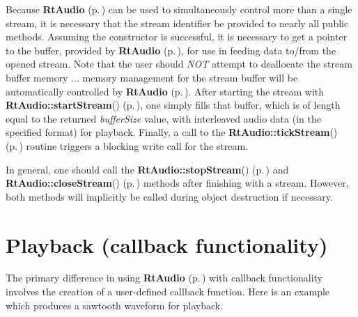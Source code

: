 Because {\bf Rt\-Audio} {\rm (p.\,\pageref{classRtAudio})} can be used to simultaneously control more than a single stream, it is necessary that the stream identifier be provided to nearly all public methods. Assuming the constructor is successful, it is necessary to get a pointer to the buffer, provided by {\bf Rt\-Audio} {\rm (p.\,\pageref{classRtAudio})}, for use in feeding data to/from the opened stream. Note that the user should {\em NOT} attempt to deallocate the stream buffer memory ... memory management for the stream buffer will be automatically controlled by {\bf Rt\-Audio} {\rm (p.\,\pageref{classRtAudio})}. After starting the stream with {\bf Rt\-Audio::start\-Stream}() {\rm (p.\,\pageref{classRtAudio_a11})}, one simply fills that buffer, which is of length equal to the returned {\em buffer\-Size} value, with interleaved audio data (in the specified format) for playback. Finally, a call to the {\bf Rt\-Audio::tick\-Stream}() {\rm (p.\,\pageref{classRtAudio_a9})} routine triggers a blocking write call for the stream.

In general, one should call the {\bf Rt\-Audio::stop\-Stream}() {\rm (p.\,\pageref{classRtAudio_a12})} and {\bf Rt\-Audio::close\-Stream}() {\rm (p.\,\pageref{classRtAudio_a10})} methods after finishing with a stream. However, both methods will implicitly be called during object destruction if necessary.

\section{Playback (callback functionality)}\label{playbackc}


The primary difference in using {\bf Rt\-Audio} {\rm (p.\,\pageref{classRtAudio})} with callback functionality involves the creation of a user-defined callback function. Here is an example which produces a sawtooth waveform for playback.

